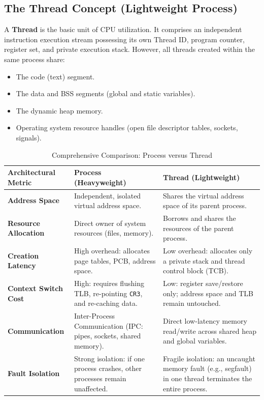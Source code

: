 \subsection{The Thread Concept (Lightweight Process)}
A \textbf{Thread} is the basic unit of CPU utilization. It comprises an independent instruction execution stream possessing its own Thread ID, program counter, register set, and private execution stack. However, all threads created within the same process share:
\begin{itemize}
    \item The code (text) segment.
    \item The data and BSS segments (global and static variables).
    \item The dynamic heap memory.
    \item Operating system resource handles (open file descriptor tables, sockets, signals).
\end{itemize}

\begin{table}[htbp]
\centering
\small
\caption{Comprehensive Comparison: Process versus Thread}
\label{tab:process_vs_thread}
\begin{tabularx}{\textwidth}{p{3.2cm} X X}
\toprule
\textbf{Architectural Metric} & \textbf{Process (Heavyweight)} & \textbf{Thread (Lightweight)} \\
\midrule
\textbf{Address Space} & Independent, isolated virtual address space. & Shares the virtual address space of its parent process. \\
\textbf{Resource Allocation} & Direct owner of system resources (files, memory). & Borrows and shares the resources of the parent process. \\
\textbf{Creation Latency} & High overhead: allocates page tables, PCB, address space. & Low overhead: allocates only a private stack and thread control block (TCB). \\
\textbf{Context Switch Cost} & High: requires flushing TLB, re-pointing \texttt{CR3}, and re-caching data. & Low: register save/restore only; address space and TLB remain untouched. \\
\textbf{Communication} & Inter-Process Communication (IPC: pipes, sockets, shared memory). & Direct low-latency memory read/write across shared heap and global variables. \\
\textbf{Fault Isolation} & Strong isolation: if one process crashes, other processes remain unaffected. & Fragile isolation: an uncaught memory fault (e.g., segfault) in one thread terminates the entire process. \\
\bottomrule
\end{tabularx}
\end{table}

